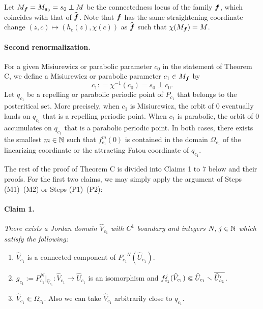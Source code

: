 Let $M_{\boldsymbol{f}} =M_{\boldsymbol{s}_0} = s_0 \perp M$ be the connectedness locus of 
the family ${\boldsymbol{f}}$, which coincides with that of $\widehat{\boldsymbol{f}}$. 
Note that $\boldsymbol{f}$ has the same straightening coordinate change 
$(z,c) \mapsto (h_c(z),\chi(c))$ as $\widehat{\boldsymbol{f}}$
such that $\chi(M_{\boldsymbol{f}})=M$.






\paragraph{\bf Second renormalization.}
For a given Misiurewicz or 
parabolic parameter $c_0$ in the statement of Theorem C, 
we define a Misiurewicz or parabolic parameter $c_1 \in M_{\boldsymbol{f}}$ by
$$
c_1: = \chi^{-1}(c_0) =s_0 \perp c_0.
$$ 
Let $q_{c_1}$ be a repelling or parabolic periodic point of $P_{c_1}$
that belongs to the postcritical set. 
More precisely, when $c_1$ is Misiurewicz, 
the orbit of $0$ 
eventually lands on $q_{c_1}$ that is a repelling periodic point. 
When $c_1$ is parabolic, 
the orbit of $0$ accumulates on $q_{c_1}$ that is a parabolic periodic point.
In both cases, there exists the smallest $m \in \mathbb N$ such that 
$f_{c_1}^m(0)$ is contained in the domain $\Omega_{c_1}$ 
of the linearizing coordinate or the attracting Fatou coordinate of $q_{c_1}$. 

The rest of the proof of Theorem C
is divided into Claims 1 to 7 below and their proofs.
For the first two claims,
we may simply apply the argument of
Steps (M1)--(M2) or Steps (P1)--(P2):

\paragraph{\bf Claim 1.}
{\it  
There exists a Jordan domain $\widehat{V}_{c_1}$ 
with $C^1$ boundary and integers $N,\,j \in \mathbb N$ 
which satisfy the following:
\begin{enumerate}[\rm (1)]
\item 
$\widehat{V}_{c_1}$ is a connected component of 
$P_{c_1}^{-N}(\widehat{U}_{c_1})$.
\item 
$g_{c_1}:=P_{c_1}^N|_{\widehat{V}_{c_1}}:\widehat{V}_{c_1} \to \widehat{U}_{c_1}$ 
is an isomorphism and 
${f_{c_1}^{j}(\widehat{V}_{c_1})} 
\Subset \widehat{U}_{c_1}  \smallsetminus  \overline{\widehat{U}_{c_1}'}$. 
\item
$\widehat{V}_{c_1} \Subset \Omega_{c_1}$.
Also we can take $\widehat{V}_{c_1}$ 
arbitrarily close to $q_{c_1}$.
\end{enumerate}
}

